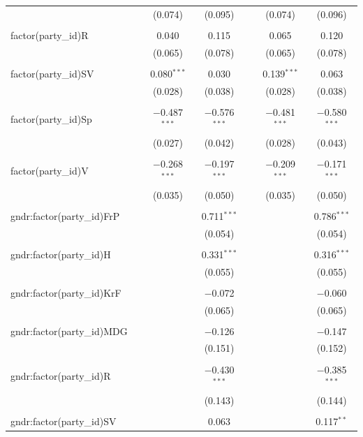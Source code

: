 \documentclass[12pt]{article}
\begin{document}
\begin{landscape}
\begin{longtable}{@{\extracolsep{5pt}}lcccccc}
			&  & (0.074) & (0.095) &  & (0.074) & (0.096) \\ 
			& & & & & & \\ 
			factor(party\_id)R &  & 0.040 & 0.115 &  & 0.065 & 0.120 \\ 
			&  & (0.065) & (0.078) &  & (0.065) & (0.078) \\ 
			& & & & & & \\ 
			factor(party\_id)SV &  & 0.080$^{***}$ & 0.030 &  & 0.139$^{***}$ & 0.063 \\ 
			&  & (0.028) & (0.038) &  & (0.028) & (0.038) \\ 
			& & & & & & \\ 
			factor(party\_id)Sp &  & $-$0.487$^{***}$ & $-$0.576$^{***}$ &  & $-$0.481$^{***}$ & $-$0.580$^{***}$ \\ 
			&  & (0.027) & (0.042) &  & (0.028) & (0.043) \\ 
			& & & & & & \\ 
			factor(party\_id)V &  & $-$0.268$^{***}$ & $-$0.197$^{***}$ &  & $-$0.209$^{***}$ & $-$0.171$^{***}$ \\ 
			&  & (0.035) & (0.050) &  & (0.035) & (0.050) \\ 
			& & & & & & \\ 
			gndr:factor(party\_id)FrP &  &  & 0.711$^{***}$ &  &  & 0.786$^{***}$ \\ 
			&  &  & (0.054) &  &  & (0.054) \\ 
			& & & & & & \\ 
			gndr:factor(party\_id)H &  &  & 0.331$^{***}$ &  &  & 0.316$^{***}$ \\ 
			&  &  & (0.055) &  &  & (0.055) \\ 
			& & & & & & \\ 
			gndr:factor(party\_id)KrF &  &  & $-$0.072 &  &  & $-$0.060 \\ 
			&  &  & (0.065) &  &  & (0.065) \\ 
			& & & & & & \\ 
			gndr:factor(party\_id)MDG &  &  & $-$0.126 &  &  & $-$0.147 \\ 
			&  &  & (0.151) &  &  & (0.152) \\ 
			& & & & & & \\ 
			gndr:factor(party\_id)R &  &  & $-$0.430$^{***}$ &  &  & $-$0.385$^{***}$ \\ 
			&  &  & (0.143) &  &  & (0.144) \\ 
			& & & & & & \\ 
			gndr:factor(party\_id)SV &  &  & 0.063 &  &  & 0.117$^{**}$ \\ 

\end{longtable}
\end{landscape}
\end{document}
